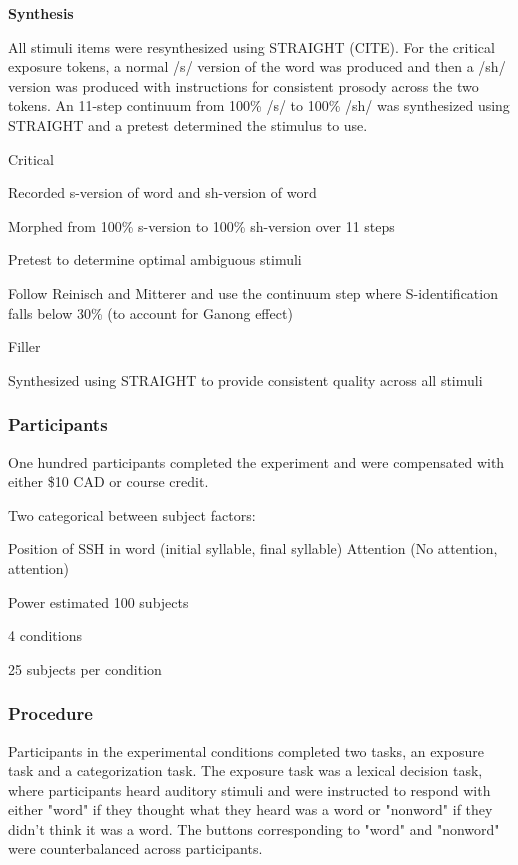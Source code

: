 \textbf{Synthesis}

All stimuli items were resynthesized using STRAIGHT (CITE).  For the critical exposure tokens, a normal /s/ version of the word was produced and then a /sh/ version was produced with instructions for consistent prosody across the two tokens.  An 11-step continuum from 100\% /s/ to 100\% /sh/ was synthesized using STRAIGHT and a pretest determined the stimulus to use.

Critical

	Recorded s-version of word and sh-version of word

	Morphed from 100\% s-version to 100\% sh-version over 11 steps

	Pretest to determine optimal ambiguous stimuli

	Follow Reinisch and Mitterer and use the continuum step where S-identification falls below 30\% (to account for Ganong effect)

Filler

	Synthesized using STRAIGHT to provide consistent quality across all stimuli

\subsubsection{Participants}

One hundred participants completed the experiment and were compensated with either \$10 CAD or course credit.

Two categorical between subject factors:

	Position of SSH in word (initial syllable, final syllable)
	Attention (No attention, attention)

Power estimated 100 subjects

4 conditions

25 subjects per condition

\subsubsection{Procedure}

Participants in the experimental conditions completed two tasks, an exposure task and a categorization task.  The exposure task was a lexical decision task, where participants heard auditory stimuli and were instructed to respond with either "word" if they thought what they heard was a word or "nonword" if they didn't think it was a word.  The buttons corresponding to "word" and "nonword" were counterbalanced across participants.

